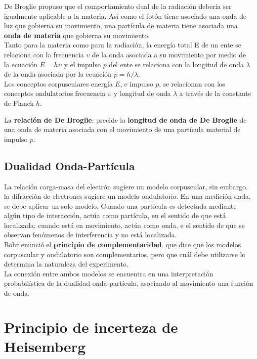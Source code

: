 \documentclass[oneside]{book}
\numberwithin{equation}{section}
\numberwithin{figure}{section}
\numberwithin{table}{section}
\begin{document}
			De Broglie propuso que el comportamiento dual de la radiación debería ser igualmente aplicable a la materia. Así como el fotón tiene asociado una onda de luz que gobierna su movimiento, una partícula de materia tiene asociada una \textbf{onda de materia} que gobierna su movimiento.\\
			
			Tanto para la materia como para la radiación, la energía total E de un ente se relaciona con la frecuencia $\upsilon$ de la onda asociada a su movimiento por medio de la ecuación $E=h\upsilon$ y el impulso $p$ del ente se relaciona con la longitud de onda $\lambda$ de la onda asociada por la ecuación $p=h/\lambda$.\\
			
			Los conceptos corpusculares energía $E$, e impulso $p$, se relacionan con los conceptos ondulatorios frecuencia $\upsilon$ y longitud de onda $\lambda$ a través de la constante de Planck $h$.
			
			La \textbf{relación de De Broglie}:  precide la \textbf{longitud de onda de De Broglie} de una onda de materia asociada con el movimiento de una partícula material de impulso $p$.
		
			\subsection{Dualidad Onda-Partícula}
			
				La relación carga-masa del electrón sugiere un modelo corpuscular, sin embargo, la difracción de electrones sugiere un modelo ondulatorio. En una medición dada, se debe aplicar un solo modelo. Cuando una partícula es detectada mediante algún tipo de interacción, actúa como partícula, en el sentido de que está localizada; cuando está en movimiento, actúa como onda, e el sentido de que se observan fenómenos de interferencia y no está localizada.\\
				
				Bohr enunció el \textbf{principio de complementaridad}, que dice que los modelos corpuscular y ondulatorio son complementarios, pero que cuál debe utilizarse lo determina la naturaleza del experimento.\\
				
				La conexión entre ambos modelos se encuentra en una interpretación probabilística de la dualidad onda-partícula, asociando al movimiento una función de onda.\\
			
		\section{Principio de incerteza de Heisemberg}
				
\end{document}

